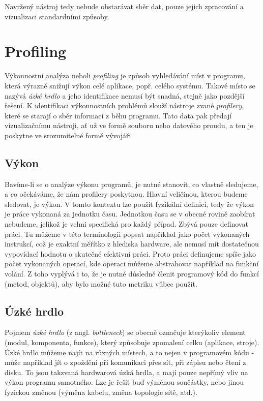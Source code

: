 \documentclass[czech,BP]{thesiskiv}
\begin{document}
Navržený nástroj tedy nebude obstarávat sběr dat, pouze jejich zpracování a vizualizaci standardními způsoby.

\newpage

\chapter{Profiling}

Výkonnostní analýza neboli \emph{profiling} je způsob vyhledávání míst v programu, která výrazně snižují výkon celé aplikace, popř. celého systému. Takové místo se nazývá \emph{úzké hrdlo} a jeho identifikace nemusí být snadná, stejně jako pozdější řešení. K identifikaci výkonnostních problémů slouží nástroje zvané \emph{profilery}, které se starají o sběr informací z běhu programu. Tato data pak předají vizualizačnímu nástroji, ať už ve formě souboru nebo datového proudu, a ten je poskytne ve srozumitelné formě vývojáři.

\section{Výkon}

Bavíme-li se o analýze výkonu programů, je nutné stanovit, co vlastně sledujeme, a co očekáváme, že nám profilery poskytnou. Hlavní veličinou, kterou budeme sledovat, je výkon. V tomto kontextu lze použít fyzikální definici, tedy že výkon je práce vykonaná za jednotku času. Jednotkou času se v obecné rovině zaobírat nebudeme, jelikož je velmi specifická pro každý případ. Zbývá pouze definovat práci. Tu můžeme v této terminologii popsat například jako počet vykonaných instrukcí, což je exaktní měřítko z hlediska hardware, ale nemusí mít dostatečnou vypovídací hodnotu o skutečné efektivní práci. Proto práci definujeme spíše jako počet vykonaných operací, kde operaci můžeme abstrahovat například na funkční volání. Z toho vyplývá i to, že je nutné důsledně členit programový kód do funkcí (metod, objektů), aby bylo možné tuto metriku vůbec použít.

\section{Úzké hrdlo}

Pojmem \emph{úzké hrdlo} (z angl. \emph{bottleneck}) se obecně označuje kterýkoliv element (modul, komponenta, funkce), který způsobuje zpomalení celku (aplikace, stroje). Úzké hrdlo můžeme najít na různých místech, a to nejen v programovém kódu - může například jít o zpoždění při komunikaci přes síť, při zápisu nebo čtení z disku. To jsou takzvaná hardwarová úzká hrdla, a mají pouze nepřímý vliv na výkon programu samotného. Lze je řešit buď výměnou součástky, nebo jinou fyzickou změnou (výměna kabelu, změna topologie sítě, atd.).
\end{document}

